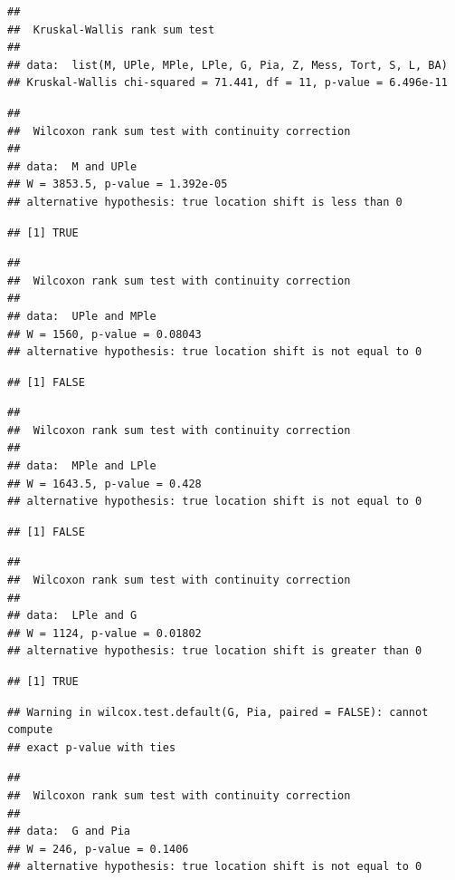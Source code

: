 \documentclass[]{article}
\begin{document}
\begin{verbatim}
## 
##  Kruskal-Wallis rank sum test
## 
## data:  list(M, UPle, MPle, LPle, G, Pia, Z, Mess, Tort, S, L, BA)
## Kruskal-Wallis chi-squared = 71.441, df = 11, p-value = 6.496e-11
\end{verbatim}

\begin{verbatim}
## 
##  Wilcoxon rank sum test with continuity correction
## 
## data:  M and UPle
## W = 3853.5, p-value = 1.392e-05
## alternative hypothesis: true location shift is less than 0
\end{verbatim}

\begin{verbatim}
## [1] TRUE
\end{verbatim}

\begin{verbatim}
## 
##  Wilcoxon rank sum test with continuity correction
## 
## data:  UPle and MPle
## W = 1560, p-value = 0.08043
## alternative hypothesis: true location shift is not equal to 0
\end{verbatim}

\begin{verbatim}
## [1] FALSE
\end{verbatim}

\begin{verbatim}
## 
##  Wilcoxon rank sum test with continuity correction
## 
## data:  MPle and LPle
## W = 1643.5, p-value = 0.428
## alternative hypothesis: true location shift is not equal to 0
\end{verbatim}

\begin{verbatim}
## [1] FALSE
\end{verbatim}

\begin{verbatim}
## 
##  Wilcoxon rank sum test with continuity correction
## 
## data:  LPle and G
## W = 1124, p-value = 0.01802
## alternative hypothesis: true location shift is greater than 0
\end{verbatim}

\begin{verbatim}
## [1] TRUE
\end{verbatim}

\begin{verbatim}
## Warning in wilcox.test.default(G, Pia, paired = FALSE): cannot compute
## exact p-value with ties
\end{verbatim}

\begin{verbatim}
## 
##  Wilcoxon rank sum test with continuity correction
## 
## data:  G and Pia
## W = 246, p-value = 0.1406
## alternative hypothesis: true location shift is not equal to 0
\end{verbatim}
\end{document}
